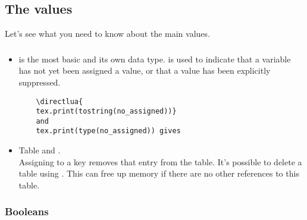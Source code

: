 

\subsection{The values} %
\label{sub:the_values}
Let's see what you need to know about the main values.

 \subsubsection{} %
 \label{ssub:_code_nil}


  \begin{itemize}

    \item   {} is the most basic and its own data type.  is used to indicate that a variable has not yet been assigned a value, or that a value has been explicitly suppressed.

\begin{mybox}
  \begin{verbatim}
    \directlua{
    tex.print(tostring(no_assigned))}
    and
    tex.print(type(no_assigned)) gives
  \end{verbatim}
\end{mybox}

\item Table and .\\

Assigning  to a key removes that entry from the table. It's possible to delete a table using . This can free up memory if there are no other references to this table.

  \end{itemize}


\subsubsection{Booleans} %
\label{ssub:booleans}

